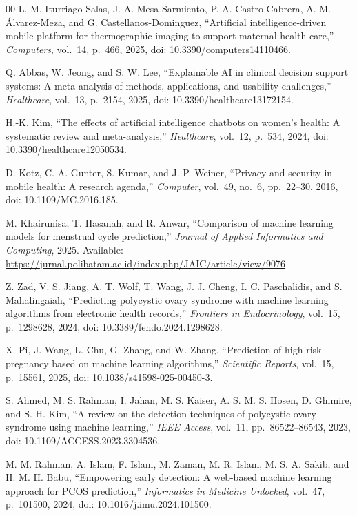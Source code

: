 \begin{thebibliography}{00}
L. M. Iturriago-Salas, J. A. Mesa-Sarmiento, P. A. Castro-Cabrera,
A. M. \'{A}lvarez-Meza, and G. Castellanos-Dominguez,
``Artificial intelligence-driven mobile platform for thermographic imaging
to support maternal health care,''
\textit{Computers}, vol.~14, p.~466, 2025,
doi: 10.3390/computers14110466.

Q. Abbas, W. Jeong, and S. W. Lee,
``Explainable AI in clinical decision support systems: A meta-analysis of
methods, applications, and usability challenges,''
\textit{Healthcare}, vol.~13, p.~2154, 2025,
doi: 10.3390/healthcare13172154.

H.-K. Kim,
``The effects of artificial intelligence chatbots on women's health:
A systematic review and meta-analysis,''
\textit{Healthcare}, vol.~12, p.~534, 2024,
doi: 10.3390/healthcare12050534.

D. Kotz, C. A. Gunter, S. Kumar, and J. P. Weiner,
``Privacy and security in mobile health: A research agenda,''
\textit{Computer}, vol.~49, no.~6, pp.~22--30, 2016,
doi: 10.1109/MC.2016.185.

M. Khairunisa, T. Hasanah, and R. Anwar,
``Comparison of machine learning models for menstrual cycle prediction,''
\textit{Journal of Applied Informatics and Computing}, 2025.
Available: \url{https://jurnal.polibatam.ac.id/index.php/JAIC/article/view/9076}

Z. Zad, V. S. Jiang, A. T. Wolf, T. Wang, J. J. Cheng,
I. C. Paschalidis, and S. Mahalingaiah,
``Predicting polycystic ovary syndrome with machine learning algorithms
from electronic health records,''
\textit{Frontiers in Endocrinology}, vol.~15, p.~1298628, 2024,
doi: 10.3389/fendo.2024.1298628.

X. Pi, J. Wang, L. Chu, G. Zhang, and W. Zhang,
``Prediction of high-risk pregnancy based on machine learning algorithms,''
\textit{Scientific Reports}, vol.~15, p.~15561, 2025,
doi: 10.1038/s41598-025-00450-3.

S. Ahmed, M. S. Rahman, I. Jahan, M. S. Kaiser,
A. S. M. S. Hosen, D. Ghimire, and S.-H. Kim,
``A review on the detection techniques of polycystic ovary syndrome
using machine learning,''
\textit{IEEE Access}, vol.~11, pp.~86522--86543, 2023,
doi: 10.1109/ACCESS.2023.3304536.

M. M. Rahman, A. Islam, F. Islam, M. Zaman,
M. R. Islam, M. S. A. Sakib, and H. M. H. Babu,
``Empowering early detection: A web-based machine learning approach
for PCOS prediction,''
\textit{Informatics in Medicine Unlocked}, vol.~47, p.~101500, 2024,
doi: 10.1016/j.imu.2024.101500.


\end{thebibliography}
